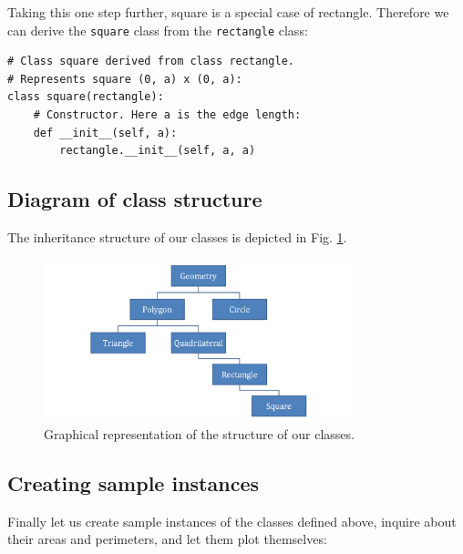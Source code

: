 Taking this one step further, square is a special case of rectangle. Therefore 
we can derive the {\tt square} class from the {\tt rectangle} class:

\begin{verbatim}
# Class square derived from class rectangle.
# Represents square (0, a) x (0, a):
class square(rectangle):
    # Constructor. Here a is the edge length:
    def __init__(self, a):
        rectangle.__init__(self, a, a)
\end{verbatim}

\subsection{Diagram of class structure}

The inheritance structure of our classes is depicted in Fig. \ref{fig:classes}.

\begin{figure}[!ht]
\begin{center}
\includegraphics[width=0.8\textwidth]{imgp/classes.png}
\end{center}
\vspace{-2mm}
\caption{Graphical representation of the structure of our classes.}
\label{fig:classes}
\end{figure}

\subsection{Creating sample instances}

Finally let us create sample instances of the classes defined above, inquire
about their areas and perimeters, and let them plot themselves:


